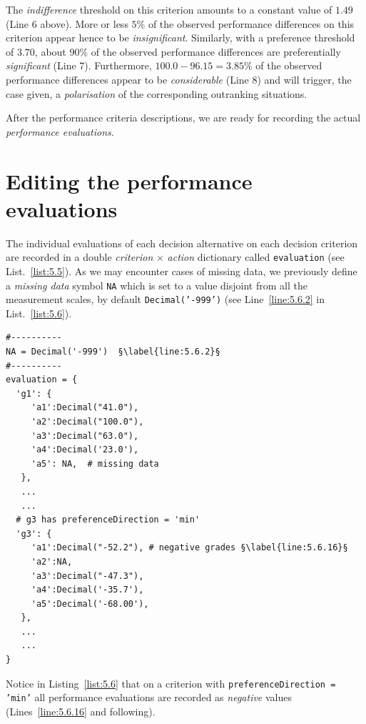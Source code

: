 The \emph{indifference} threshold on this criterion amounts to a constant value of $1.49$ (Line 6 above). More or less $5\%$ of the observed performance differences on this criterion appear hence to be \emph{insignificant}. Similarly, with a preference threshold of $3.70$, about $90\%$ of the observed performance differences are preferentially \emph{significant} (Line 7). Furthermore, $100.0 - 96.15 = 3.85\%$ of the observed performance differences appear to be \emph{considerable} (Line 8) and will trigger, the case given, a \emph{polarisation} of the corresponding outranking situations.

After the performance criteria descriptions, we are ready for recording the actual \emph{performance evaluations}.

\section{Editing the performance evaluations}
\label{sec:5.5}

The individual evaluations of each decision alternative on each decision criterion are recorded in a double \emph{criterion} $\times$ \emph{action} dictionary called \texttt{evaluation} (see List.~\ref{list:5.5}). As we may encounter cases of missing data, we previously define a \emph{missing data} symbol \texttt{NA} which is set to a value disjoint from all the measurement scales, by default \texttt{Decimal('-999')} (see Line~\ref{line:5.6.2} in List.~\vref{list:5.6}).
\begin{lstlisting}[caption={Editing performance evaluations},label=list:5.6]
#----------
NA = Decimal('-999')  §\label{line:5.6.2}§
#----------
evaluation = {
  'g1': {
     'a1':Decimal("41.0"),
     'a2':Decimal("100.0"),
     'a3':Decimal("63.0"),
     'a4':Decimal('23.0'),
     'a5': NA,  # missing data
   },
   ...
   ...
  # g3 has preferenceDirection = 'min'
  'g3': {
     'a1':Decimal("-52.2"), # negative grades §\label{line:5.6.16}§
     'a2':NA,
     'a3':Decimal("-47.3"),
     'a4':Decimal('-35.7'),
     'a5':Decimal('-68.00'),
   },
   ...
   ...
}
\end{lstlisting}

Notice in Listing~\vref{list:5.6} that on a criterion with \texttt{preference\-Direction = 'min'} all performance evaluations are recorded as \emph{negative} values (Lines~\ref{line:5.6.16} and following).

